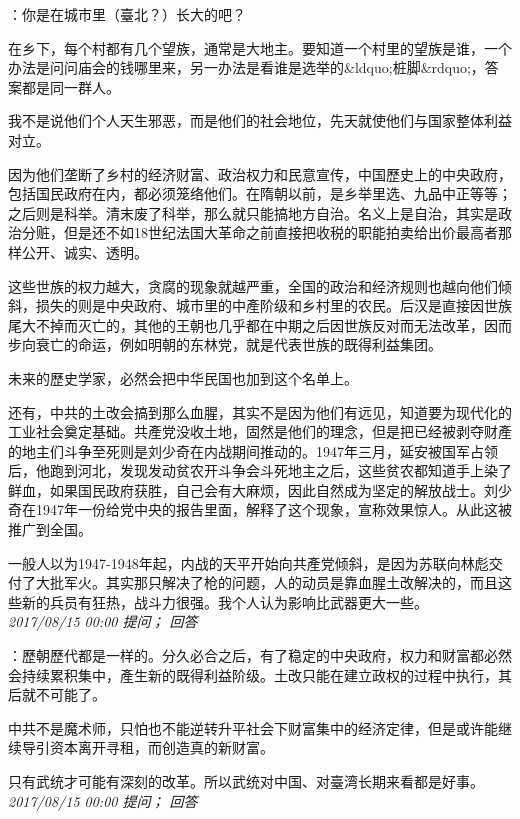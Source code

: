 \documentclass[twocolumn]{ctexart}
\begin{document}
：你是在城市里（臺北？）长大的吧？

在乡下，每个村都有几个望族，通常是大地主。要知道一个村里的望族是谁，一个办法是问问庙会的钱哪里来，另一办法是看谁是选举的\&ldquo;桩脚\&rdquo;，答案都是同一群人。

我不是说他们个人天生邪恶，而是他们的社会地位，先天就使他们与国家整体利益对立。

因为他们垄断了乡村的经济财富、政治权力和民意宣传，中国歷史上的中央政府，包括国民政府在内，都必须笼络他们。在隋朝以前，是乡举里选、九品中正等等；之后则是科举。清末废了科举，那么就只能搞地方自治。名义上是自治，其实是政治分赃，但是还不如18世纪法国大革命之前直接把收税的职能拍卖给出价最高者那样公开、诚实、透明。

这些世族的权力越大，贪腐的现象就越严重，全国的政治和经济规则也越向他们倾斜，损失的则是中央政府、城市里的中產阶级和乡村里的农民。后汉是直接因世族尾大不掉而灭亡的，其他的王朝也几乎都在中期之后因世族反对而无法改革，因而步向衰亡的命运，例如明朝的东林党，就是代表世族的既得利益集团。

未来的歷史学家，必然会把中华民国也加到这个名单上。

还有，中共的土改会搞到那么血腥，其实不是因为他们有远见，知道要为现代化的工业社会奠定基础。共產党没收土地，固然是他们的理念，但是把已经被剥夺财產的地主们斗争至死则是刘少奇在内战期间推动的。1947年三月，延安被国军占领后，他跑到河北，发现发动贫农开斗争会斗死地主之后，这些贫农都知道手上染了鲜血，如果国民政府获胜，自己会有大麻烦，因此自然成为坚定的解放战士。刘少奇在1947年一份给党中央的报告里面，解释了这个现象，宣称效果惊人。从此这被推广到全国。

一般人以为1947-1948年起，内战的天平开始向共產党倾斜，是因为苏联向林彪交付了大批军火。其实那只解决了枪的问题，人的动员是靠血腥土改解决的，而且这些新的兵员有狂热，战斗力很强。我个人认为影响比武器更大一些。\\

\textit{\hfill\noindent\small 2017/08/15 00:00 提问； 回答}

：歷朝歷代都是一样的。分久必合之后，有了稳定的中央政府，权力和财富都必然会持续累积集中，產生新的既得利益阶级。土改只能在建立政权的过程中执行，其后就不可能了。

中共不是魔术师，只怕也不能逆转升平社会下财富集中的经济定律，但是或许能继续导引资本离开寻租，而创造真的新财富。

只有武统才可能有深刻的改革。所以武统对中国、对臺湾长期来看都是好事。\\

\textit{\hfill\noindent\small 2017/08/15 00:00 提问； 回答}
\end{document}
